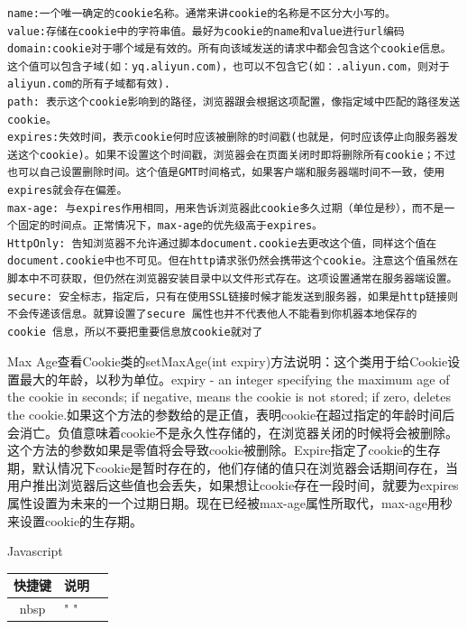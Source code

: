 \documentclass[11pt,fleqn]{book}
\makeatletter
\numberwithin{dummy}{section}
\theoremstyle{ocrenumbox}
\theoremstyle{blacknumex}
\theoremstyle{blacknumbox}
\theoremstyle{ocrenum}
\renewcommand{\section}{\@startsection{section}{1}{\z@}
	{-4ex \@plus -1ex \@minus -.4ex}
	{1ex \@plus.2ex }
	{\normalfont\large\sffamily\bfseries}}
\renewcommand\paragraph{\@startsection{paragraph}{4}{\z@}
	{-2ex \@plus-.2ex \@minus .2ex}
	{.1ex}
	{\normalfont\small\sffamily\bfseries}}
\makeatother
\begin{document}
\begin{lstlisting}
name:一个唯一确定的cookie名称。通常来讲cookie的名称是不区分大小写的。
value:存储在cookie中的字符串值。最好为cookie的name和value进行url编码
domain:cookie对于哪个域是有效的。所有向该域发送的请求中都会包含这个cookie信息。这个值可以包含子域(如：yq.aliyun.com)，也可以不包含它(如：.aliyun.com，则对于aliyun.com的所有子域都有效).
path: 表示这个cookie影响到的路径，浏览器跟会根据这项配置，像指定域中匹配的路径发送cookie。
expires:失效时间，表示cookie何时应该被删除的时间戳(也就是，何时应该停止向服务器发送这个cookie)。如果不设置这个时间戳，浏览器会在页面关闭时即将删除所有cookie；不过也可以自己设置删除时间。这个值是GMT时间格式，如果客户端和服务器端时间不一致，使用expires就会存在偏差。
max-age: 与expires作用相同，用来告诉浏览器此cookie多久过期（单位是秒），而不是一个固定的时间点。正常情况下，max-age的优先级高于expires。
HttpOnly: 告知浏览器不允许通过脚本document.cookie去更改这个值，同样这个值在document.cookie中也不可见。但在http请求张仍然会携带这个cookie。注意这个值虽然在脚本中不可获取，但仍然在浏览器安装目录中以文件形式存在。这项设置通常在服务器端设置。
secure: 安全标志，指定后，只有在使用SSL链接时候才能发送到服务器，如果是http链接则不会传递该信息。就算设置了secure 属性也并不代表他人不能看到你机器本地保存的 cookie 信息，所以不要把重要信息放cookie就对了
\end{lstlisting}

\paragraph{Max Age}查看Cookie类的setMaxAge(int expiry)方法说明：这个类用于给Cookie设置最大的年龄，以秒为单位。expiry - an integer specifying the maximum age of the cookie in seconds; if negative, means the cookie is not stored; if zero, deletes the cookie.如果这个方法的参数给的是正值，表明cookie在超过指定的年龄时间后会消亡。负值意味着cookie不是永久性存储的，在浏览器关闭的时候将会被删除。这个方法的参数如果是零值将会导致cookie被删除。Expire指定了cookie的生存期，默认情况下cookie是暂时存在的，他们存储的值只在浏览器会话期间存在，当用户推出浏览器后这些值也会丢失，如果想让cookie存在一段时间，就要为expires属性设置为未来的一个过期日期。现在已经被max-age属性所取代，max-age用秒来设置cookie的生存期。

\section{Javascript}

\begin{tabular}{cp{8cm}c}
	\hline
	\multirow{1}{*}{快捷键}
	& \multicolumn{1}{c}{说明}  \\
	\hline			
	nbsp & " " \\
	\hline
\end{tabular}
\end{document}
